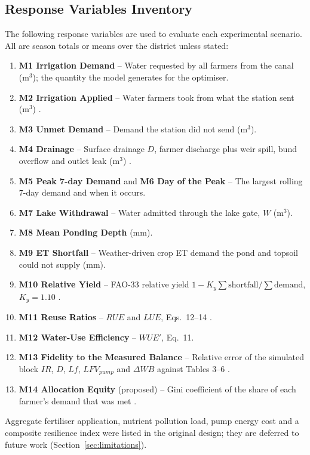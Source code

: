 \documentclass{article}
\begin{document}
\subsection{Response Variables Inventory}
\label{sec:response_variables}
\begin{changed}
The following response variables are used to evaluate each experimental scenario. All are season totals or means over the district unless stated:
\begin{enumerate}
    \item \textbf{M1 Irrigation Demand} -- Water requested by all farmers from the canal (m$^3$); the quantity the model generates for the optimiser.
    \item \textbf{M2 Irrigation Applied} -- Water farmers took from what the station sent (m$^3$) \cite{Okura2025WaterBalance}.
    \item \textbf{M3 Unmet Demand} -- Demand the station did not send (m$^3$).
    \item \textbf{M4 Drainage} -- Surface drainage $D$, farmer discharge plus weir spill, bund overflow and outlet leak (m$^3$) \cite{Okura2025WaterBalance}.
    \item \textbf{M5 Peak 7-day Demand} and \textbf{M6 Day of the Peak} -- The largest rolling 7-day demand and when it occurs.
    \item \textbf{M7 Lake Withdrawal} -- Water admitted through the lake gate, $W$ (m$^3$).
    \item \textbf{M8 Mean Ponding Depth} (mm).
    \item \textbf{M9 ET Shortfall} -- Weather-driven crop ET demand the pond and topsoil could not supply (mm).
    \item \textbf{M10 Relative Yield} -- FAO-33 relative yield $1-K_y\sum\text{shortfall}/\sum\text{demand}$, $K_y=1.10$ \cite{Doorenbos1979}.
    \item \textbf{M11 Reuse Ratios} -- $RUE$ and $LUE$, \cite{Okura2025WaterBalance} Eqs.~12--14 \cite{Takeda2001Cyclic, Maruyama2008}.
    \item \textbf{M12 Water-Use Efficiency} -- $WUE'$, \cite{Okura2025WaterBalance} Eq.~11.
    \item \textbf{M13 Fidelity to the Measured Balance} -- Relative error of the simulated block $IR$, $D$, $Lf$, $LFV_{pump}$ and $\Delta WB$ against \cite{Okura2025WaterBalance} Tables 3--6 \cite{Jones2020DigitalTwin}.
    \item \textbf{M14 Allocation Equity} (proposed) -- Gini coefficient of the share of each farmer's demand that was met \cite{Cao2017}.
\end{enumerate}
Aggregate fertiliser application, nutrient pollution load, pump energy cost and a composite resilience index were listed in the original design; they are deferred to future work (Section~\ref{sec:limitations}).
\end{changed}
\end{document}

